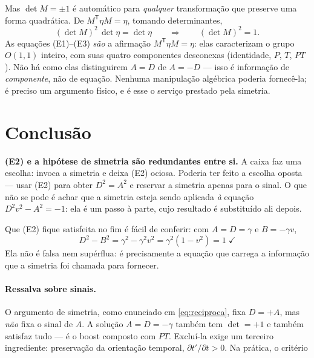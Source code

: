 \documentclass[12pt,a4paper,oneside]{book}
\begin{document}
Mas $\det M=\pm1$ é automático para \emph{qualquer} transformação que
preserve uma forma quadrática. De $M^{\mathsf T}\eta M=\eta$, tomando
determinantes,
\begin{equation}
  (\det M)^2\,\det\eta = \det\eta
  \qquad\Longrightarrow\qquad
  (\det M)^2 = 1 .
\end{equation}
As equações (E1)--(E3) \emph{são} a afirmação $M^{\mathsf T}\eta M=\eta$: elas
caracterizam o grupo $O(1,1)$ inteiro, com suas quatro componentes
desconexas (identidade, $P$, $T$, $PT$). Não há como elas distinguirem $A=D$
de $A=-D$ --- isso é informação de \emph{componente}, não de equação. Nenhuma
manipulação algébrica poderia fornecê-la; é preciso um argumento físico, e é
esse o serviço prestado pela simetria.

\section{Conclusão}

\begin{central}
\textbf{(E2) e a hipótese de simetria são redundantes entre si.} A caixa faz
uma escolha: invoca a simetria e deixa (E2) ociosa. Poderia ter feito a
escolha oposta --- usar (E2) para obter $D^2=A^2$ e reservar a simetria
apenas para o sinal. O que não se pode é achar que a simetria esteja sendo
aplicada \emph{à} equação $D^2v^2-A^2=-1$: ela é um passo à parte, cujo
resultado é substituído ali depois.
\end{central}

Que (E2) fique satisfeita no fim é fácil de conferir: com $A=D=\gamma$ e
$B=-\gamma v$,
\begin{equation}
  D^2 - B^2 = \gamma^2 - \gamma^2v^2 = \gamma^2(1-v^2) = 1 \;\checkmark
\end{equation}
Ela não é falsa nem supérflua: é precisamente a equação que carrega a
informação que a simetria foi chamada para fornecer.

\paragraph{Ressalva sobre sinais.} O argumento de simetria, como enunciado em
\eqref{eq:reciproca}, fixa $D=+A$, mas \emph{não} fixa o sinal de $A$. A
solução $A=D=-\gamma$ também tem $\det=+1$ e também satisfaz tudo --- é o
boost composto com $PT$. Excluí-la exige um terceiro ingrediente:
preservação da orientação temporal, $\partial t'/\partial t>0$. Na prática,
o critério
\end{document}
